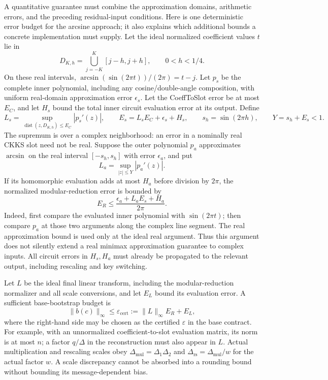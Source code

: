  A quantitative guarantee must combine the approximation domains, arithmetic errors, and the preceding residual-input conditions. Here is one deterministic error budget for the arcsine approach; it also explains which additional bounds a concrete implementation must supply. Let the ideal normalized coefficient values $t$ lie in
\[
D_{K,h}=\bigcup_{j=-K}^{K}[j-h,j+h],\qquad 0<h<1/4.
\]
On these real intervals, $\arcsin(\sin(2\pi t))/(2\pi)=t-j$. Let $p_s$ be the complete inner polynomial, including any cosine/double-angle composition, with uniform real-domain approximation error $\epsilon_s$. Let the CoeffToSlot error be at most $E_C$, and let $H_s$ bound the total inner circuit evaluation error at its output. Define
\[
L_s=\sup_{\operatorname{dist}(z,D_{K,h})\leq E_C}|p_s'(z)|,
\qquad E_s=L_sE_C+\epsilon_s+H_s,
\qquad s_h=\sin(2\pi h),\qquad Y=s_h+E_s<1.
\]
The supremum is over a complex neighborhood: an error in a nominally real CKKS slot need not be real. Suppose the outer polynomial $p_a$ approximates $\arcsin$ on the real interval $[-s_h,s_h]$ with error $\epsilon_a$, and put
\[
L_a=\sup_{|z|\leq Y}|p_a'(z)|.
\]
If its homomorphic evaluation adds at most $H_a$ before division by $2\pi$, the normalized modular-reduction error is bounded by
\[
E_R\leq\frac{\epsilon_a+L_aE_s+H_a}{2\pi}.
\]
Indeed, first compare the evaluated inner polynomial with $\sin(2\pi t)$; then compare $p_a$ at those two arguments along the complex line segment. The real approximation bound is used only at the ideal real argument. Thus this argument does not silently extend a real minimax approximation guarantee to complex inputs. All circuit errors in $H_s,H_a$ must already be propagated to the relevant output, including rescaling and key switching.

Let $L$ be the ideal final linear transform, including the modular-reduction normalizer and all scale conversions, and let $E_L$ bound its evaluation error. A sufficient base-bootstrap budget is
\[
\|b(c)\|_\infty\leq\varepsilon_{\mathrm{cert}}:=\|L\|_\infty E_R+E_L,
\]
where the right-hand side may be chosen as the certified $\varepsilon$ in the base contract. For example, with an unnormalized coefficient-to-slot evaluation matrix, its norm is at most $n$; a factor $q/\Delta$ in the reconstruction must also appear in $L$. Actual multiplication and rescaling scales obey $\Delta_{\mathrm{mul}}=\Delta_1\Delta_2$ and $\Delta_{\mathrm{rs}}=\Delta_{\mathrm{mul}}/w$ for the actual factor $w$. A scale discrepancy cannot be absorbed into a rounding bound without bounding its message-dependent bias.

